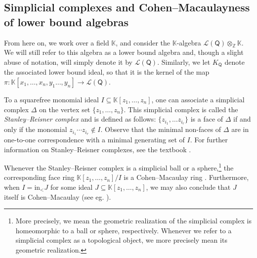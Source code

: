 \documentclass[ALCO,published]{cedram}
\numberwithin{equation}{section}
\newcommand{\1}{^{-1}}
\def\Q{\mathsf{Q}}
\begin{document}
\subsection{Simplicial complexes and Cohen--Macaulayness of lower bound algebras}
From here on, we work over a field $\mathbb{K}$, and consider the $\mathbb{K}$-algebra $\mathcal{L}(\Q)\otimes_\mathbb{Z}\mathbb{K}$. We will still refer to this algebra as a lower bound algebra and, though a slight abuse of notation, will simply denote it by $\mathcal{L}(\Q)$. Similarly, we let $K_\Q$ denote the associated lower bound ideal, so that it is the kernel of the map $\pi:\mathbb{K}[x_1,\dots,x_n,y_1\dots,y_n]\rightarrow \mathcal{L}(\Q)$.

To a squarefree monomial ideal $I\subseteq \mathbb{K}[z_1,\dots,z_n]$, one can associate a simplicial complex $\Delta$ on the vertex set $\{z_1,\dots,z_n\}$. This simplicial complex is called the \textit{Stanley--Reisner complex} and is defined as follows: $\{z_{i_1},\dots z_{i_r}\}$ is a face of $\Delta$ if and only if the monomial $z_{i_1}\cdots z_{i_r}\notin I$. Observe that the minimal non-faces of $\Delta$ are in one-to-one correspondence with a minimal generating set of $I$. For further information on Stanley--Reisner complexes, see the textbook \cite[Chapter 1]{MillerSturmfels}.

Whenever the Stanley--Reisner complex is a simplicial ball or a sphere,\footnote{More precisely, we mean the geometric realization of the simplicial complex is homeomorphic to a ball or sphere, respectively.  Whenever we refer to a simplicial complex as a topological object, we more precisely mean its geometric realization.} the corresponding face ring $\mathbb{K}[z_1,\dots, z_n]/I$ is a Cohen--Macaulay ring \cite{Munkres}. Furthermore, when $I = \textrm{in}_< J$ for some ideal $J\subseteq \mathbb{K}[z_1,\dots, z_n]$, we may also conclude that $J$ itself is Cohen--Macaulay (see eg. \cite[Proposition 3.1]{BC03}).
\end{document}
